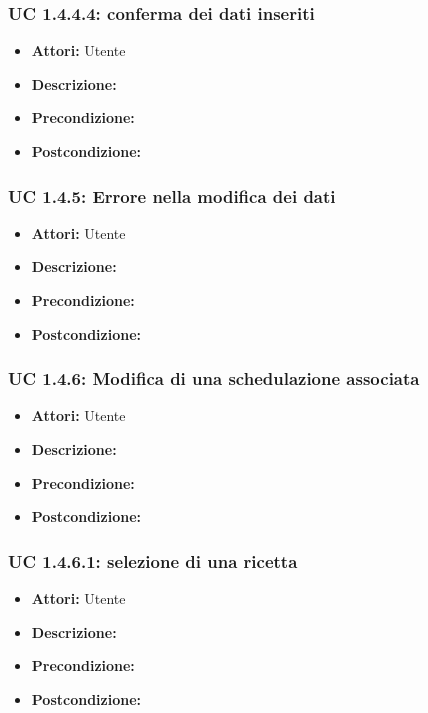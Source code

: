 \subsubsection{UC 1.4.4.4: conferma dei dati inseriti}

\begin{itemize}
\item \textbf{Attori:} Utente
\item \textbf{Descrizione:} 
\item \textbf{Precondizione:} 
\item \textbf{Postcondizione:} 
\end{itemize}

\subsubsection{UC 1.4.5: Errore nella modifica dei dati}

\begin{itemize}
\item \textbf{Attori:} Utente
\item \textbf{Descrizione:} 
\item \textbf{Precondizione:} 
\item \textbf{Postcondizione:} 
\end{itemize}

\subsubsection{UC 1.4.6: Modifica di una schedulazione associata}

\begin{itemize}
\item \textbf{Attori:} Utente
\item \textbf{Descrizione:} 
\item \textbf{Precondizione:} 
\item \textbf{Postcondizione:} 
\end{itemize}

\subsubsection{UC 1.4.6.1: selezione di una ricetta}

\begin{itemize}
\item \textbf{Attori:} Utente
\item \textbf{Descrizione:} 
\item \textbf{Precondizione:} 
\item \textbf{Postcondizione:} 
\end{itemize}

